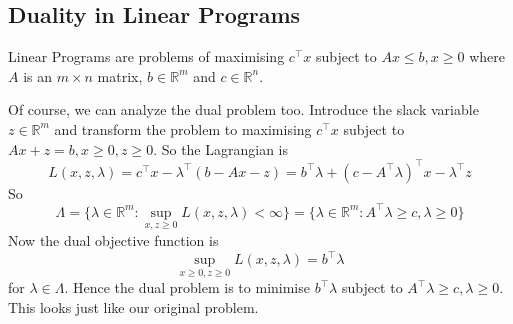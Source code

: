 \subsection{Duality in Linear Programs}
\begin{definition}
    Linear Programs are problems of maximising $c^\top x$ subject to $Ax\le b,x\ge 0$ where $A$ is an $m\times n$ matrix, $b\in\mathbb R^m$ and $c\in\mathbb R^n$.
\end{definition}
Of course, we can analyze the dual problem too.
Introduce the slack variable $z\in\mathbb R^m$ and transform the problem to maximising $c^\top x$ subject to $Ax+z=b,x\ge 0,z\ge 0$.
So the Lagrangian is
$$L(x,z,\lambda)=c^\top x-\lambda^\top(b-Ax-z)=b^\top\lambda +(c-A^\top\lambda)^\top x-\lambda^\top z$$
So
$$\Lambda=\{\lambda\in\mathbb R^m:\sup_{x,z\ge 0}L(x,z,\lambda)<\infty\}=\{\lambda\in\mathbb R^m:A^\top\lambda\ge c,\lambda\ge 0\}$$
Now the dual objective function is
$$\sup_{x\ge 0,z\ge 0}L(x,z,\lambda)=b^\top\lambda$$
for $\lambda\in\Lambda$.
Hence the dual problem is to minimise $b^\top\lambda$ subject to $A^\top\lambda\ge c,\lambda\ge 0$.
This looks just like our original problem.
